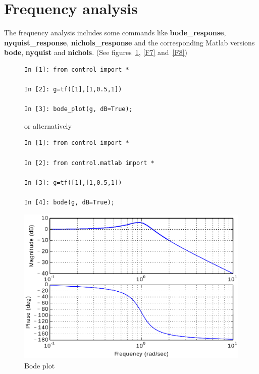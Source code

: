 \newpage
\section{Frequency analysis}

The frequency analysis includes some commands like \textbf{bode\_response}, 
\textbf{nyquist\_response}, \textbf{nichols\_response} and the corresponding 
Matlab versions \textbf{bode}, \textbf{nyquist} and \textbf{nichols}. (See 
figures~\ref{F6}, \ref{F7} and~\ref{F8})

\begin{figure}[htbp]
\begin{minipage}[t]{0.55\textwidth}
  \vspace{0pt}
\begin{lstlisting}[linewidth=7cm,xleftmargin=0cm]
In [1]: from control import *

In [2]: g=tf([1],[1,0.5,1])

In [3]: bode_plot(g, dB=True);
\end{lstlisting}

or alternatively

\begin{lstlisting}[linewidth=7cm,xleftmargin=0cm]
In [1]: from control import *

In [2]: from control.matlab import *

In [3]: g=tf([1],[1,0.5,1])

In [4]: bode(g, dB=True);
\end{lstlisting}
\end{minipage}%
\begin{minipage}[t]{0.5\textwidth}
  \vspace{0pt} \centering
  \includegraphics[width=\textwidth]{eps/bode.eps}
\end{minipage}
\caption{Bode plot}
\label{F6}
\end{figure}

